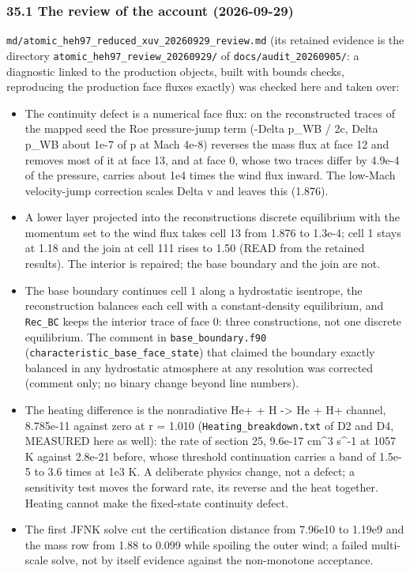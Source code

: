 \documentclass[english,a4paper]{my_memo}
\providecommand{\tightlist}{\setlength{\itemsep}{0pt}\setlength{\parskip}{0pt}}
\begin{document}
\subsubsection{35.1 The review of the account (2026-09-29)}\label{351-the-review-of-the-account-2026-09-29}

\texttt{md/atomic\_heh97\_reduced\_xuv\_20260929\_review.md} (its retained evidence is
the directory \texttt{atomic\_heh97\_review\_20260929/} of \texttt{docs/audit\_20260905/}: a
diagnostic linked to
the production objects, built with bounds checks, reproducing the production
face fluxes exactly) was checked here and taken over:

\begin{itemize}
\tightlist
\item
  The continuity defect is a numerical face flux: on the reconstructed
  traces of the mapped seed the Roe pressure-jump term (-Delta p\_WB / 2c,
  Delta p\_WB about 1e-7 of p at Mach 4e-8) reverses the mass flux at face 12
  and removes most of it at face 13, and at face 0, whose two traces differ by
  4.9e-4 of the pressure, carries about 1e4 times the wind flux inward. The
  low-Mach velocity-jump correction scales Delta v and leaves this (1.876).
\item
  A lower layer projected into the reconstruction\textquotesingle s discrete equilibrium
  with the momentum set to the wind flux takes cell 13 from 1.876 to 1.3e-4;
  cell 1 stays at 1.18 and the join at cell 111 rises to 1.50 (READ from the
  retained results). The interior is repaired; the base boundary and the
  join are not.
\item
  The base boundary continues cell 1 along a hydrostatic isentrope, the
  reconstruction balances each cell with a constant-density equilibrium, and
  \texttt{Rec\_BC} keeps the interior trace of face 0: three constructions, not one
  discrete equilibrium. The comment in \texttt{base\_boundary.f90}
  (\texttt{characteristic\_base\_face\_state}) that claimed the boundary exactly
  balanced in any hydrostatic atmosphere at any resolution was corrected
  (comment only; no binary change beyond line numbers).
\item
  The heating difference is the nonradiative He+ + H -\textgreater{} He + H+ channel,
  8.785e-11 against zero at r = 1.010 (\texttt{Heating\_breakdown.txt} of D2 and D4,
  MEASURED here as well): the rate of section 25, 9.6e-17 cm\^{}3 s\^{}-1 at
  1057 K against 2.8e-21 before, whose threshold continuation carries a band
  of 1.5e-5 to 3.6 times at 1e3 K. A deliberate physics change, not a defect;
  a sensitivity test moves the forward rate, its reverse and the heat
  together. Heating cannot make the fixed-state continuity defect.
\item
  The first JFNK solve cut the certification distance from 7.96e10 to
  1.19e9 and the mass row from 1.88 to 0.099 while spoiling the outer wind; a
  failed multi-scale solve, not by itself evidence against the non-monotone
  acceptance.
\end{itemize}
\end{document}

